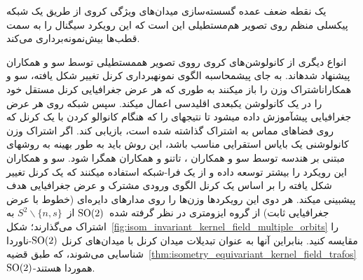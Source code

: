 یک نقطه ضعف عمده گسسته‌سازی میدان‌های ویژگی کروی از طریق یک شبکه پیکسلی منظم روی تصویر هم‌مستطیلی این است که این رویکرد سیگنال را به سمت قطب‌ها بیش‌نمونه‌برداری می‌کند.


انواع دیگری از کانولوشن‌های کروی رووی تصویر هممستطیلی توسط  سو و همکاران\cite{su2017spherical,su2019kernel} پیشنهاد شدهاند.
به جای پیشمحاسبه الگوی نمونهبرداری کرنل تغییر شکل یافته،  سو و همکاران\cite{su2017spherical}اشتراک وزن را باز میکنند به طوری که هر عرض جغرافیایی کرنل مستقل خود را در یک کانولوشن یکبعدی اقلیدسی اعمال میکند.
سپس شبکه روی هر عرض جغرافیایی پیشآموزش داده میشود تا نتیجهای را که هنگام کانوالو کردن با یک کرنل که روی فضاهای مماس به اشتراک گذاشته شده است، بازیابی کند.
اگر اشتراک وزن کانولوشنی یک بایاس استقرایی مناسب باشد، این روش باید به طور بهینه به روشهای مبتنی بر هندسه توسط  سو و همکاران\cite{zhao2018distortion,tateno2018distortion} ، تاتنو و همکاران همگرا شود.
سو و همکاران \cite{su2019kernel} این رویکرد را بیشتر توسعه داده و از یک فرا-شبکه استفاده میکنند که یک کرنل تغییر شکل یافته را بر اساس یک کرنل الگوی ورودی مشترک و عرض جغرافیایی هدف پیشبینی میکند.
هر دوی این رویکردها وزن‌ها را روی مدارهای دایره‌ای (خطوط با عرض جغرافیایی ثابت) از گروه ایزومتری در نظر گرفته شده~$\operatorname{SO}(2)$ از~$S^2 \backslash \{n,s\}$ به اشتراک می‌گذارند؛ شکل~\ref{fig:isom_invariant_kernel_field_multiple_orbits} را مقایسه کنید.
بنابراین آنها به عنوان تبدیلات میدان کرنل با میدان‌های کرنل $\operatorname{SO}(2)$-ناوردا شناسایی می‌شوند، که طبق قضیه~\ref{thm:isometry_equivariant_kernel_field_trafos} $\operatorname{SO}(2)$-هموردا هستند.


